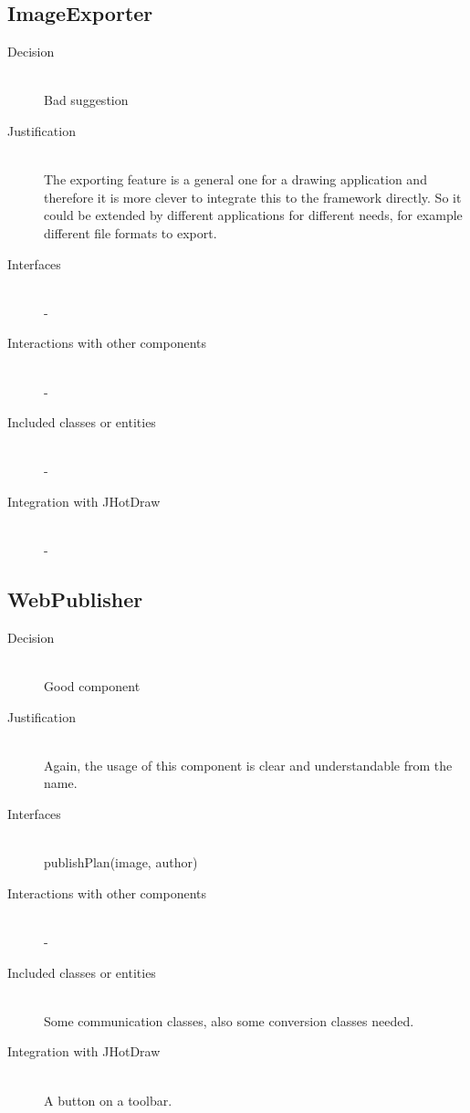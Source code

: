 
\subsection{ImageExporter}
	\begin{description}
		\item[Decision] \hfill \\ Bad suggestion
		\item[Justification] \hfill \\ The exporting feature is a general one for a drawing application and therefore it is more clever to integrate this to the framework directly. So it could be extended by different applications for different needs, for example different file formats to export.
		\item[Interfaces] \hfill \\ -
		\item[Interactions with other components] \hfill \\ -
		\item[Included classes or entities] \hfill \\ -
		\item[Integration with JHotDraw] \hfill \\ -
	\end{description}

\subsection{WebPublisher}
	\begin{description}
		\item[Decision] \hfill \\ Good component
		\item[Justification] \hfill \\ Again, the usage of this component is clear and understandable from the name.
		\item[Interfaces] \hfill \\ publishPlan(image, author)
		\item[Interactions with other components] \hfill \\ -
		\item[Included classes or entities] \hfill \\ Some communication classes, also some conversion classes needed.
		\item[Integration with JHotDraw] \hfill \\ A button on a toolbar.
	\end{description}

